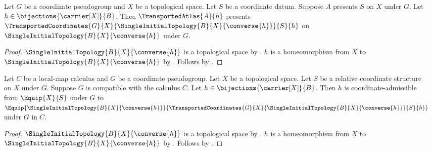 \begin{theorem}\label{bijection_transported_coordinates_presentation}
    Let $G$ be a coordinate pseudogroup and $X$ be a topological space.
    Let $S$ be a coordinate datum.
    Suppose $A$ presents $S$ on $X$ under $G$.
    Let $h\in\bijections{\carrier[X]}{B}$.
    Then $\TransportedAtlas{A}{h}$ presents
        $\TransportedCoordinates{G}{X}{\SingleInitialTopology{B}{X}{\converse{h}}}{S}{h}$
        on $\SingleInitialTopology{B}{X}{\converse{h}}$ under $G$.
\end{theorem}
\begin{proof}
    $\SingleInitialTopology{B}{X}{\converse{h}}$ is a topological space by
        .
    $h$ is a homeomorphism from $X$ to $\SingleInitialTopology{B}{X}{\converse{h}}$ by
        .
    Follows by .
\end{proof}

\begin{theorem}\label{bijection_transported_coordinates_admissible}
    Let $C$ be a local-map calculus and $G$ be a coordinate pseudogroup.
    Let $X$ be a topological space.
    Let $S$ be a relative coordinate structure on $X$ under $G$.
    Suppose $G$ is compatible with the calculus $C$.
    Let $h\in\bijections{\carrier[X]}{B}$.
    Then $h$ is coordinate-admissible from $\Equip{X}{S}$ under $G$ to
        $\Equip{\SingleInitialTopology{B}{X}{\converse{h}}}
            {\TransportedCoordinates{G}{X}{\SingleInitialTopology{B}{X}{\converse{h}}}{S}{h}}$
        under $G$ in $C$.
\end{theorem}
\begin{proof}
    $\SingleInitialTopology{B}{X}{\converse{h}}$ is a topological space by
        .
    $h$ is a homeomorphism from $X$ to $\SingleInitialTopology{B}{X}{\converse{h}}$ by
        .
    Follows by .
\end{proof}
